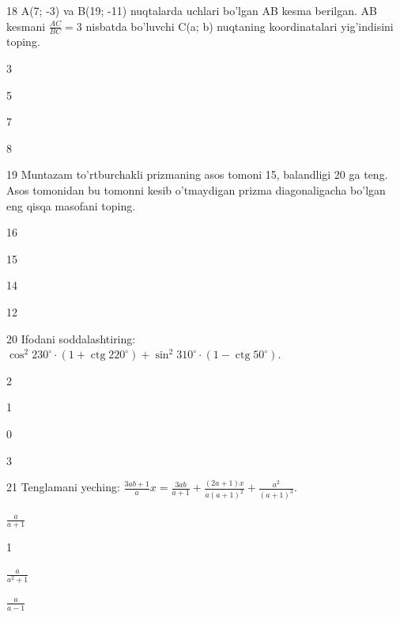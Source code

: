 \documentclass[14pt]{article}
\begin{document}
\begin{questionbox}{18}
    A(7; -3) va B(19; -11) nuqtalarda uchlari bo'lgan AB kesma berilgan. AB kesmani \(\frac{AC}{BC} = 3\) nisbatda bo'luvchi C(a; b) nuqtaning koordinatalari yig'indisini toping.
    \begin{options}
        \item 3
        \item 5
        \item 7
        \item 8
    \end{options}
\end{questionbox}

\begin{questionbox}{19}
    Muntazam to'rtburchakli prizmaning asos tomoni 15, balandligi 20 ga teng. Asos tomonidan bu tomonni kesib o'tmaydigan prizma diagonaligacha bo'lgan eng qisqa masofani toping.
    \begin{options}
        \item 16
        \item 15
        \item 14
        \item 12
    \end{options}
\end{questionbox}

\begin{questionbox}{20}
    Ifodani soddalashtiring: \(\cos^2 230^\circ \cdot (1 + \operatorname{ctg}220^\circ) + \sin^2 310^\circ \cdot (1 - \operatorname{ctg} 50^\circ)\).
    \begin{options}
        \item 2
        \item 1
        \item 0
        \item 3
    \end{options}
\end{questionbox}

\begin{questionbox}{21}
    Tenglamani yeching: \(\frac{3ab+1}{a} x = \frac{3ab}{a+1} + \frac{(2a+1)x}{a(a+1)^2} + \frac{a^2}{(a+1)^3}\).
    \begin{options}
        \item \(\frac{a}{a+1}\)
        \item 1
        \item \(\frac{a}{a^2+1}\)
        \item \(\frac{a}{a-1}\)
    \end{options}
\end{questionbox}
\end{document}
